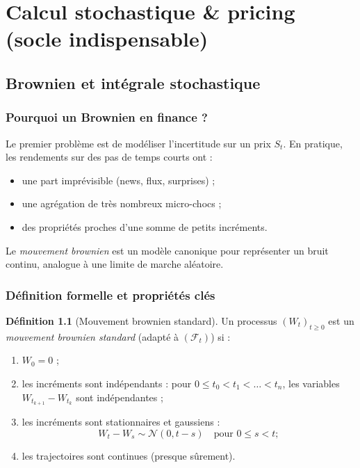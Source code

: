 \documentclass[11pt,a4paper]{report}
\newcommand{\1}{\mathbbm{1}}
\newcommand{\Normal}{\mathcal{N}}
\newcommand{\F}{\mathcal{F}}
\theoremstyle{definition}
\newtheorem{definition}{Définition}[chapter]
\theoremstyle{plain}
\theoremstyle{remark}
\begin{document}
\part{Calcul stochastique \& pricing (socle indispensable)}

\chapter{Brownien et intégrale stochastique}
\label{chap:brownien}

\section{Pourquoi un Brownien en finance ?}
Le premier problème est de modéliser l'incertitude sur un prix $S_t$.
En pratique, les rendements sur des pas de temps courts ont :
\begin{itemize}
  \item une part imprévisible (news, flux, surprises) ;
  \item une agrégation de très nombreux micro-chocs ;
  \item des propriétés proches d'une somme de petits incréments.
\end{itemize}
Le \emph{mouvement brownien} est un modèle canonique pour représenter un bruit continu,
analogue à une limite de marche aléatoire.

\section{Définition formelle et propriétés clés}
\begin{definition}[Mouvement brownien standard]
Un processus $(W_t)_{t\ge 0}$ est un \emph{mouvement brownien standard} (adapté à $(\F_t)$) si :
\begin{enumerate}[label=\roman*)]
  \item $W_0=0$ ;
  \item les incréments sont indépendants : pour $0\le t_0 < t_1 < \dots < t_n$, les variables $W_{t_{k+1}}-W_{t_k}$ sont indépendantes ;
  \item les incréments sont stationnaires et gaussiens :
  \[
  W_t - W_s \sim \Normal(0, t-s)\quad \text{pour } 0\le s<t ;
  \]
  \item les trajectoires sont continues (presque sûrement).
\end{enumerate}
\end{definition}
\end{document}
